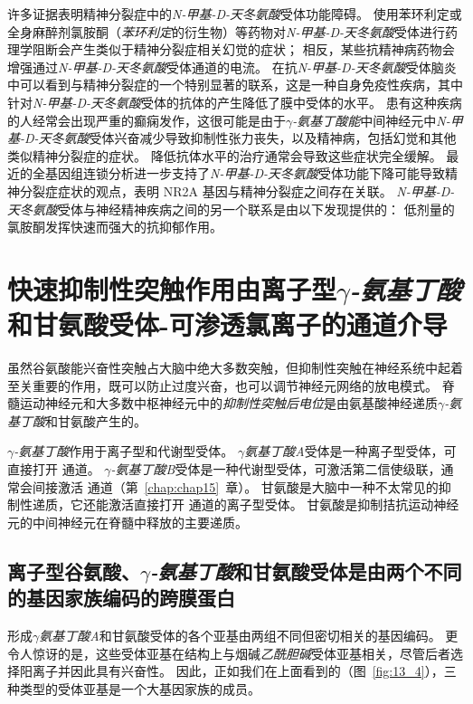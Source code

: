 许多证据表明精神分裂症中的\textit{N-甲基-D-天冬氨酸}受体功能障碍。
使用苯环利定或全身麻醉剂氯胺酮（\textit{苯环利定}的衍生物）等药物对\textit{N-甲基-D-天冬氨酸}受体进行药理学阻断会产生类似于精神分裂症相关幻觉的症状；
相反，某些抗精神病药物会增强通过\textit{N-甲基-D-天冬氨酸}受体通道的电流。
在抗\textit{N-甲基-D-天冬氨酸}受体脑炎中可以看到与精神分裂症的一个特别显著的联系，这是一种自身免疫性疾病，其中针对\textit{N-甲基-D-天冬氨酸}受体的抗体的产生降低了膜中受体的水平。
患有这种疾病的人经常会出现严重的癫痫发作，这很可能是由于\textit{$\gamma$-氨基丁酸能}中间神经元中\textit{N-甲基-D-天冬氨酸}受体兴奋减少导致抑制性张力丧失，以及精神病，包括幻觉和其他类似精神分裂症的症状。
降低抗体水平的治疗通常会导致这些症状完全缓解。
最近的全基因组连锁分析进一步支持了\textit{N-甲基-D-天冬氨酸}受体功能下降可能导致精神分裂症症状的观点，表明 NR2A 基因与精神分裂症之间存在关联。
\textit{N-甲基-D-天冬氨酸}受体与神经精神疾病之间的另一个联系是由以下发现提供的：
低剂量的氯胺酮发挥快速而强大的抗抑郁作用。



\section{快速抑制性突触作用由离子型\textit{$\gamma$-氨基丁酸}和甘氨酸受体-可渗透氯离子的通道介导}

虽然谷氨酸能兴奋性突触占大脑中绝大多数突触，但抑制性突触在神经系统中起着至关重要的作用，既可以防止过度兴奋，也可以调节神经元网络的放电模式。
脊髓运动神经元和大多数中枢神经元中的\textit{抑制性突触后电位}是由氨基酸神经递质\textit{$\gamma$-氨基丁酸}和甘氨酸产生的。


\textit{$\gamma$-氨基丁酸}作用于离子型和代谢型受体。
\textit{$\gamma$氨基丁酸A}受体是一种离子型受体，可直接打开  通道。
\textit{$\gamma$-氨基丁酸B}受体是一种代谢型受体，可激活第二信使级联，通常会间接激活  通道（第~\ref{chap:chap15}~章）。 
甘氨酸是大脑中一种不太常见的抑制性递质，它还能激活直接打开  通道的离子型受体。
甘氨酸是抑制拮抗运动神经元的中间神经元在脊髓中释放的主要递质。



\subsection{离子型谷氨酸、\textit{$\gamma$-氨基丁酸}和甘氨酸受体是由两个不同的基因家族编码的跨膜蛋白}

形成\textit{$\gamma$氨基丁酸A}和甘氨酸受体的各个亚基由两组不同但密切相关的基因编码。
更令人惊讶的是，这些受体亚基在结构上与烟碱\textit{乙酰胆碱}受体亚基相关，尽管后者选择阳离子并因此具有兴奋性。 
因此，正如我们在上面看到的（图~\ref{fig:13_4}），三种类型的受体亚基是一个大基因家族的成员。


